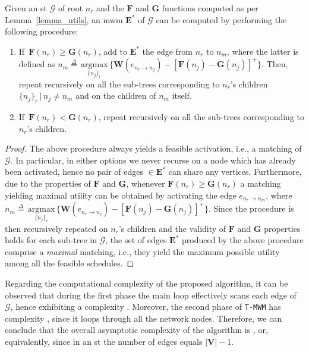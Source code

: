 \begin{lem}
\label{lemma_active_edges}
Given an \gls{st} $\mathcal{G}$ of root $n_r$ and the $\mathbf{F}$ and $\mathbf{G}$ functions computed as per Lemma~\ref{lemma_utils}, an \gls{mwm} $\mathbf{E^*}$ of $\mathcal{G}$ can be computed by performing the following procedure:
\begin{enumerate}
\item If $ \, \mathbf{F}(n_r) \geq \mathbf{G}(n_r) $, add to $\mathbf{E^*}$ the edge from $n_r$ to $n_m$, where the latter is defined as $n_m \mathop = \limits^{\Delta} \, \underset{ \{ n_j \}_r }{\mathrm{argmax}} \, \{ \mathbf{W} ( e_{n_r \to n_j} ) - \left[ \mathbf{F}(n_j) - \mathbf{G}(n_j) \right]^+ \}$. Then, repeat recursively on all the sub-trees corresponding to $n_r$'s children $\{ n_j\}_r \, \vert \, n_j \neq n_m$ and on the children of $n_m$ itself.
\item If $ \, \mathbf{F}(n_r) < \mathbf{G}(n_r) $, repeat recursively on all the sub-trees corresponding to $n_r$'s children.
\end{enumerate}
\end{lem}

\begin{proof}
The above procedure always yields a feasible activation, i.e., a matching of $\mathcal{G}$.  In particular, in either options we never recurse on a node which has already been activated, hence no pair of edges $\in \mathbf{E^*}$ can share any vertices. Furthermore, due to the properties of $\mathbf{F}$ and $\mathbf{G}$, whenever $\mathbf{F}(n_r) \geq \mathbf{G}(n_r)$ a matching yielding maximal utility can be obtained by activating the edge $e_{ n_r \to n_m }$, where $n_m \mathop = \limits^{\Delta} \, \underset{ \{ n_j \}_r }{\mathrm{argmax}} \, \{ \mathbf{W} ( e_{n_r \to n_j} ) - \left[ \mathbf{F}(n_j) - \mathbf{G}(n_j) \right]^+ \}$.
Since the procedure is then recursively repeated on $n_r$'s children and the validity of $\mathbf{F}$ and $\mathbf{G}$ properties holds for each sub-tree in $\mathcal{G}$, the set of edges $\mathbf{E^*}$ produced by the above procedure comprise a \textit{maximal} matching, i.e., they yield the maximum possible utility among all the feasible schedules. 
\end{proof}

Regarding the computational complexity of the proposed algorithm, it can be observed that during the first phase the main loop effectively scans each edge of $\mathcal{G}$, hence exhibiting a complexity . Moreover,
the second phase of \texttt{T-MWM} has complexity , since it loops through all the network nodes.
Therefore, we can conclude that the overall asymptotic complexity of the algorithm is , or, equivalently,  since in an \gls{st} the number of edges equals $\vert \mathbf{V} \vert - 1$.

